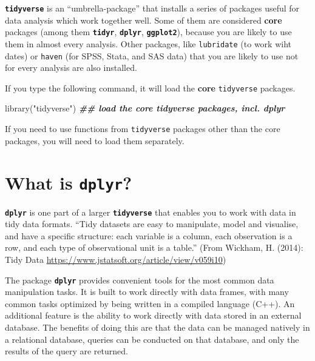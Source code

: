 \documentclass[
]{book}
\newenvironment{Shaded}{\begin{snugshade}}{\end{snugshade}}
\newcommand{\DocumentationTok}[1]{\textcolor[rgb]{0.56,0.35,0.01}{\textbf{\textit{#1}}}}
\newcommand{\FunctionTok}[1]{\textcolor[rgb]{0.00,0.00,0.00}{#1}}
\newcommand{\NormalTok}[1]{#1}
\newcommand{\StringTok}[1]{\textcolor[rgb]{0.31,0.60,0.02}{#1}}
\begin{document}
\textbf{\texttt{tidyverse}} is an ``umbrella-package'' that installs a series of packages useful for data analysis which work together well. Some of them are considered \textbf{core} packages (among them \textbf{\texttt{tidyr}}, \textbf{\texttt{dplyr}}, \textbf{\texttt{ggplot2}}), because you are likely to use them in almost every analysis. Other packages, like \texttt{lubridate} (to work wiht dates) or \texttt{haven} (for SPSS, Stata, and SAS data) that you are likely to use not for every analysis are also installed.

If you type the following command, it will load the \textbf{core} \texttt{tidyverse} packages.

\begin{Shaded}
\begin{Highlighting}[]
\FunctionTok{library}\NormalTok{(}\StringTok{"tidyverse"}\NormalTok{)    }\DocumentationTok{\#\# load the core tidyverse packages, incl. dplyr}
\end{Highlighting}
\end{Shaded}

If you need to use functions from \texttt{tidyverse} packages other than the core packages, you will need to load them separately.

\hypertarget{what-is-dplyr}{%
\section{\texorpdfstring{What is \textbf{\texttt{dplyr}}?}{What is dplyr?}}\label{what-is-dplyr}}

\textbf{\texttt{dplyr}} is one part of a larger \textbf{\texttt{tidyverse}} that enables you to work
with data in tidy data formats. ``Tidy datasets are easy to manipulate, model and visualise, and have a specific structure: each variable is a column, each observation is a row, and each type of observational unit is a table.'' (From Wickham, H. (2014): Tidy Data \url{https://www.jstatsoft.org/article/view/v059i10})

The package \textbf{\texttt{dplyr}} provides convenient tools for the most common data manipulation
tasks. It is built to work directly with data frames, with many common tasks
optimized by being written in a compiled language (C++). An additional feature is the
ability to work directly with data stored in an external database. The benefits of
doing this are that the data can be managed natively in a relational database,
queries can be conducted on that database, and only the results of the query are
returned.
\end{document}

